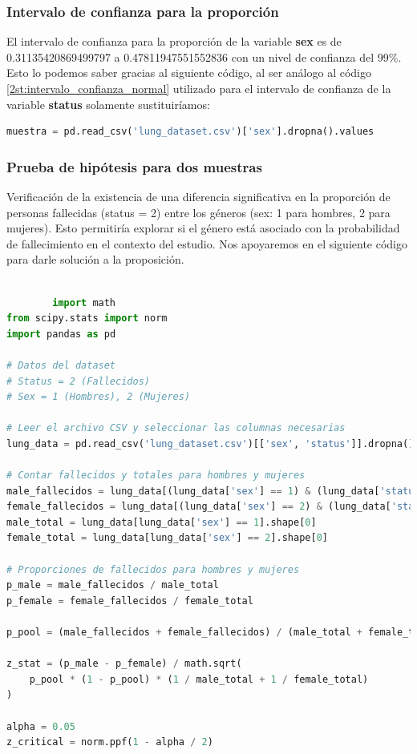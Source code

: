 \documentclass[a4paper,12pt]{article}
\begin{document}
    \subsubsection*{Intervalo de confianza para la proporción}

    El intervalo de confianza para la proporción de la variable \textbf{sex} es de 0.31135420869499797 a 0.47811947551552836 con un nivel de confianza del 99\%. Esto lo podemos saber gracias al siguiente código, al ser análogo al código \ref{2st:intervalo_confianza_normal} utilizado para el intervalo de confianza de la variable \textbf{status} solamente sustituiríamos:

    \begin{lstlisting}[language=Python, caption={Código en Python para calcular el intervalo de confianza}]
        muestra = pd.read_csv('lung_dataset.csv')['sex'].dropna().values

    \end{lstlisting}

    \subsubsection*{Prueba de hipótesis para dos muestras}

    Verificación de la existencia de una diferencia significativa en la proporción de personas fallecidas (status = 2) entre los géneros (sex: 1 para hombres, 2 para mujeres). Esto permitiría explorar si el género está asociado con la probabilidad de fallecimiento en el contexto del estudio. Nos apoyaremos en el siguiente código para darle solución a la proposición.

    \begin{lstlisting}[language=Python]
        
        import math
from scipy.stats import norm
import pandas as pd

# Datos del dataset
# Status = 2 (Fallecidos)
# Sex = 1 (Hombres), 2 (Mujeres)

# Leer el archivo CSV y seleccionar las columnas necesarias
lung_data = pd.read_csv('lung_dataset.csv')[['sex', 'status']].dropna()

# Contar fallecidos y totales para hombres y mujeres
male_fallecidos = lung_data[(lung_data['sex'] == 1) & (lung_data['status'] == 2)].shape[0]
female_fallecidos = lung_data[(lung_data['sex'] == 2) & (lung_data['status'] == 2)].shape[0]
male_total = lung_data[lung_data['sex'] == 1].shape[0]
female_total = lung_data[lung_data['sex'] == 2].shape[0]

# Proporciones de fallecidos para hombres y mujeres
p_male = male_fallecidos / male_total
p_female = female_fallecidos / female_total

p_pool = (male_fallecidos + female_fallecidos) / (male_total + female_total)

z_stat = (p_male - p_female) / math.sqrt(
    p_pool * (1 - p_pool) * (1 / male_total + 1 / female_total)
)

alpha = 0.05
z_critical = norm.ppf(1 - alpha / 2)


    \end{lstlisting}
\end{document}
